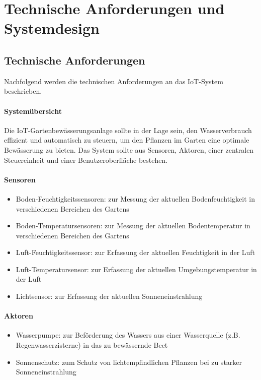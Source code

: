 
\section{Technische Anforderungen und Systemdesign}

\subsection{Technische Anforderungen}
Nachfolgend werden die technischen Anforderungen an das IoT-System beschrieben.

\paragraph{Systemübersicht}
Die IoT-Gartenbewässerungsanlage sollte in der Lage sein, den Wasserverbrauch effizient und automatisch zu steuern, um den Pflanzen im Garten eine optimale Bewässerung zu bieten. Das System sollte aus Sensoren, Aktoren, einer zentralen Steuereinheit und einer Benutzeroberfläche bestehen.

\paragraph{Sensoren}
\begin{itemize}
\item Boden-Feuchtigkeitssensoren: zur Messung der aktuellen Bodenfeuchtigkeit in verschiedenen Bereichen des Gartens
\item Boden-Temperatursensoren: zur Messung der aktuellen Bodentemperatur in verschiedenen Bereichen des Gartens
\item Luft-Feuchtigkeitssensor: zur Erfassung der aktuellen Feuchtigkeit in der Luft
\item Luft-Temperatursensor: zur Erfassung der aktuellen Umgebungstemperatur in der Luft
\item Lichtsensor: zur Erfassung der aktuellen Sonneneinstrahlung
\end{itemize}

\paragraph{Aktoren}
\begin{itemize}
\item Wasserpumpe: zur Beförderung des Wassers aus einer Wasserquelle (z.B. Regenwasserzisterne) in das zu bewässernde Beet
\item Sonnenschutz: zum Schutz von lichtempfindlichen Pflanzen bei zu starker Sonneneinstrahlung 
\end{itemize}


